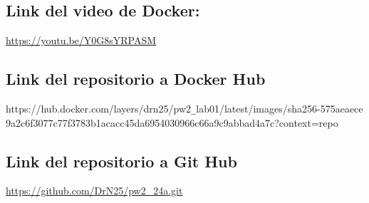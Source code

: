 \documentclass{article}
\begin{document}
\subsection{Link del video de Docker:}
\url{https://youtu.be/Y0G8sYRPASM}

\subsection{Link del repositorio a Docker Hub}
https://hub.docker.com/layers/drn25/pw2\verb|_|lab01/latest/images/sha256-575aeaece \\ 9a2c6f3077c77f3783b1acacc45da6954030966c66a9c9abbad4a7c?context=repo

\subsection{Link del repositorio a Git Hub}
\url{https://github.com/DrN25/pw2_24a.git}
\end{document}
